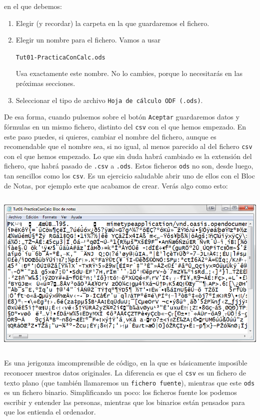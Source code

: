 \documentclass[10pt,a4paper]{article}\usepackage[]{graphicx}\usepackage[]{color}
\begin{document}
en el que debemos:
    \begin{enumerate}
    \item Elegir (y recordar) la carpeta en la que guardaremos el fichero.
    \item Elegir un nombre para el fichero. Vamos a usar
    \begin{center}
        {\tt Tut01-PracticaConCalc.ods}
    \end{center}
    Usa exactamente este nombre. No lo cambies, porque lo necesitarás en las próximas secciones.
    \item Seleccionar el tipo de archivo {\tt Hoja de cálculo ODF (.ods)}.
    \end{enumerate}
De esa forma, cuando pulsemos sobre el botón {\tt Aceptar} guardaremos datos y fórmulas en un mismo fichero, distinto del {\tt csv} con el que hemos empezado. En este paso puedes, si quieres, cambiar el nombre del fichero, aunque es recomendable que el nombre sea, si no igual, al menos parecido al del fichero {\tt csv} con el que hemos empezado. Lo que sin duda habrá cambiado es la {\sf extensión} del fichero, que habrá pasado de {\tt .csv} a {\tt .ods}. Estos ficheros {\tt ods} no son, desde luego, tan sencillos como los {\tt csv}. Es un ejercicio saludable abrir uno de ellos con el Bloc de Notas, por ejemplo este que acabamos de crear. Verás algo como esto:
    \begin{center}
    \includegraphics[height=8cm]{../fig/Tut01-Calc-tablaFrec-09.png}
    \end{center}
Es una jerigonza imcomprensible de código, en la que es básicamente imposible reconocer nuestros datos originales. La diferencia es que el {\tt csv} es un fichero de {\sf texto plano} (que también llamaremos un {\tt fichero fuente}), mientras que este {\tt ods} es un  {\sf fichero binario}. Simplificando un poco: los ficheros fuente los podemos escribir y entender las personas, mientras que los binarios están pensados para que los entienda el ordenador.
\end{document}
